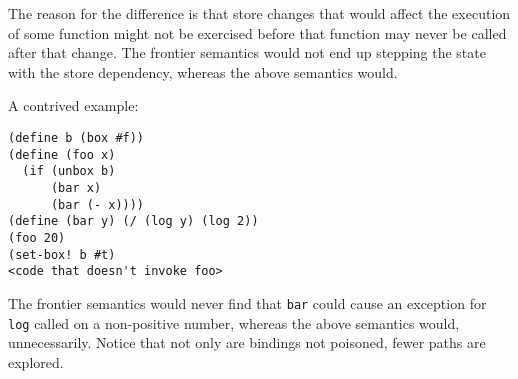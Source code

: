 \documentclass{llncs}
\begin{document}
The reason for the difference is that store changes that would affect
the execution of some function might not be exercised before that
function may never be called after that change. The frontier semantics
would not end up stepping the state with the store dependency, whereas
the above semantics would.

A contrived example:
\begin{lstlisting}
(define b (box #f))
(define (foo x)
  (if (unbox b)
      (bar x)
      (bar (- x))))
(define (bar y) (/ (log y) (log 2))
(foo 20)
(set-box! b #t)
<code that doesn't invoke foo>
\end{lstlisting}

The frontier semantics would never find that {\tt bar} could cause an
exception for {\tt log} called on a non-positive number, whereas the
above semantics would, unnecessarily. Notice that not only are
bindings not poisoned, fewer paths are explored.
\end{document}
